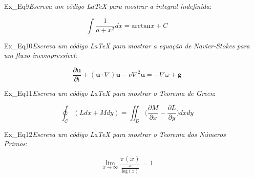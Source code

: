 \begin{texercise}{Ex_Eq9}\textit{Escreva um código \LaTeX{} para mostrar a integral indefinida}:\par\smallskip%
\begin{tcboutputlisting}
    \begin{center}
        \begin{equation*}
            \int \frac{1}{a+x^2}dx = \text{arctan} x + C
        \end{equation*}
    \end{center}
\end{tcboutputlisting}
\tcbuselistingtext%
\end{texercise}

\begin{texercise}{Ex_Eq10}\textit{Escreva um código \LaTeX{} para mostrar a equação de Navier-Stokes para um fluxo incompressível}:\par\smallskip%
\begin{tcboutputlisting}
    \begin{center}
        \begin{equation*}
            \frac{\partial{\mathbf{u}}}{\partial{t}} + (\mathbf{u} \cdot \nabla)\mathbf{u} - \nu \nabla^2 \mathbf{u} = - \nabla \omega + \mathbf{g}
        \end{equation*}
    \end{center}
\end{tcboutputlisting}
\tcbuselistingtext%
\end{texercise}

\begin{texercise}{Ex_Eq11}\textit{Escreva um código \LaTeX{} para mostrar o Teorema de Green}:\par\smallskip%
\begin{tcboutputlisting}
    \begin{center}
        \begin{equation*}
            \oint_C (Ldx + Mdy) = \iint_D \bigg(\frac{\partial{M}}{\partial{x}} - \frac{\partial{L}}{\partial{y}}\bigg)dxdy
        \end{equation*}
    \end{center}
\end{tcboutputlisting}
\tcbuselistingtext%
\end{texercise}

\begin{texercise}{Ex_Eq12}\textit{Escreva um código \LaTeX{} para mostrar o Teorema dos Números Primos}:\par\smallskip%
\begin{tcboutputlisting}
    \begin{center}
        \begin{equation*}
            \lim_{x \to \infty} \frac{\pi(x)}{\frac{x}{\text{log}(x)}} = 1
        \end{equation*}
    \end{center}
\end{tcboutputlisting}
\tcbuselistingtext%
\end{texercise}


